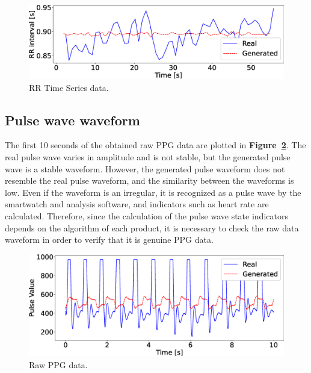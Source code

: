 \documentclass[sigchi,authordraft]{acmart}
\newcommand\figref[1]{\textbf{Figure~\ref{fig:#1}}}
\begin{document}
\begin{figure}[!t]
  \centering
  \includegraphics[width=0.8\linewidth]{figures/rr_wave.eps}
  \caption{RR Time Series data.}
  \label{fig:rr_wave}
\end{figure}


\subsection{Pulse wave waveform}
The first 10 seconds of the obtained raw PPG data are plotted in \figref{raw_wave}. The real pulse wave varies in amplitude and is not stable, but the generated pulse wave is a stable waveform. However, the generated pulse waveform does not resemble the real pulse waveform, and the similarity between the waveforms is low. Even if the waveform is an irregular, it is recognized as a pulse wave by the smartwatch and analysis software, and indicators such as heart rate are calculated. Therefore, since the calculation of the pulse wave state indicators depends on the algorithm of each product, it is necessary to check the raw data waveform in order to verify that it is genuine PPG data.

\begin{figure}[!t]
  \centering
  \includegraphics[width=0.8\linewidth]{figures/raw_wave.eps}
  \caption{Raw PPG data.}
  \label{fig:raw_wave}
\end{figure}



\end{document}
